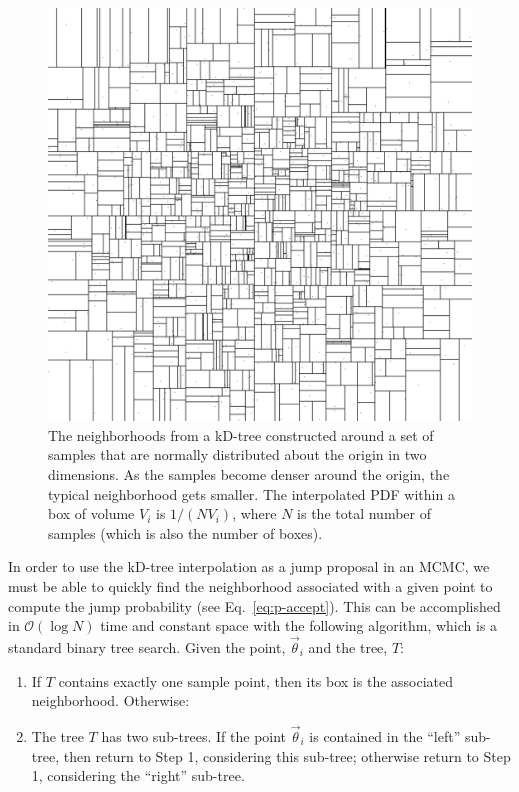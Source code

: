 \documentclass{iopart}
\newcommand{\vtheta}{\vec{\theta}}
\newcommand{\order}[1]{\mathcal{O}\left( #1 \right)}
\begin{document}
\begin{figure}
  \begin{center}
    \includegraphics[width=0.8\columnwidth]{Figure1_kdtree}
  \end{center}
  \caption{\label{fig:kD-tree} The neighborhoods from a kD-tree
    constructed around a set of samples that are normally distributed
    about the origin in two dimensions.  As the samples become denser
    around the origin, the typical neighborhood gets smaller.  The
    interpolated PDF within a box of volume $V_i$ is $1/(N V_i)$,
    where $N$ is the total number of samples (which is also the number
    of boxes).}
\end{figure}

In order to use the kD-tree interpolation as a jump proposal in an
MCMC, we must be able to quickly find the neighborhood associated with
a given point to compute the jump probability (see
Eq.~\ref{eq:p-accept}).  This can be accomplished in $\order{\log N}$
time and constant space with the following algorithm, which is a
standard binary tree search.  Given the point, $\vtheta_i$ and the
tree, $T$:
\begin{enumerate}
\item If $T$ contains exactly one sample point, then its box is the
  associated neighborhood.  Otherwise:
\item The tree $T$ has two sub-trees.  If the point $\vtheta_i$ is
  contained in the ``left'' sub-tree, then return to Step 1,
  considering this sub-tree; otherwise return to Step 1, considering
  the ``right'' sub-tree.
\end{enumerate}
\end{document}
